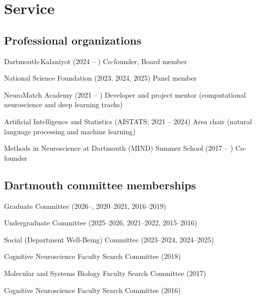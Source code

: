 \documentclass[11pt, a4paper]{article} %
\newcommand{\years}[1]{\marginnote{\footnotesize #1}} %
\begin{document}

\section*{Service}
\subsection*{Professional organizations}
\begin{etaremune}
\item Dartmouth-Kalaniyot (2024 -- ) Co-founder, Board member

\item National Science Foundation (2023, 2024, 2025) Panel member

\item NeuroMatch Academy (2021 -- ) Developer and project mentor (computational neuroscience and deep learning tracks)

\item Artificial Intelligence and Statistics (AISTATS; 2021 -- 2024) Area
chair (natural language processing and machine learning)

\item Methods in Neuroscience at Dartmouth (MIND) Summer School (2017 -- ) Co-founder
\end{etaremune}


\subsection*{Dartmouth committee memberships}
\begin{etaremune}
\item Graduate Committee (2026--, 2020--2021, 2016--2019)
\item Undergraduate Committee (2025--2026, 2021--2022, 2015--2016)
\item Social (Department Well-Being) Committee (2023--2024, 2024--2025)
\item Cognitive Neuroscience Faculty Search Committee (2018)
\item Molecular and Systems Biology Faculty Search Committee (2017)
\item Cognitive Neuroscience Faculty Search Committee (2016)
\end{etaremune}
\end{document}

